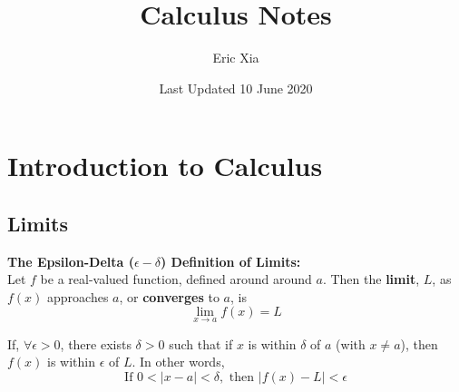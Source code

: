 \documentclass{article}
\title{Calculus Notes}
\author{Eric Xia}
\date{Last Updated 10 June 2020}
\begin{document}
    \maketitle
    \tableofcontents
    \pagebreak


    \section{Introduction to Calculus}

        \subsection{Limits}
            \color{purple} \textbf{The Epsilon-Delta ($\epsilon-\delta$) Definition of Limits:}
            \color{black} \\

            \noindent Let $f$ be a real-valued function, defined around around $a$.
            Then the \textbf{limit}, $L$, as $f(x)$ approaches $a$, or \textbf{converges} to $a$, is \\

            \begin{equation*}
                \lim_{x \to a} f(x) = L
            \end{equation*}

            \noindent If, $\forall \epsilon > 0$, there exists $\delta > 0$ such that if $x$ is
            within $\delta$ of $a$ (with $x\not = a$), then $f(x)$ is within $\epsilon$ of $L$.
            In other words, \\

            \begin{equation*}
                \text{If } 0 < |x-a| < \delta, \text{ then } |f(x)-L| < \epsilon
            \end{equation*}
\end{document}
